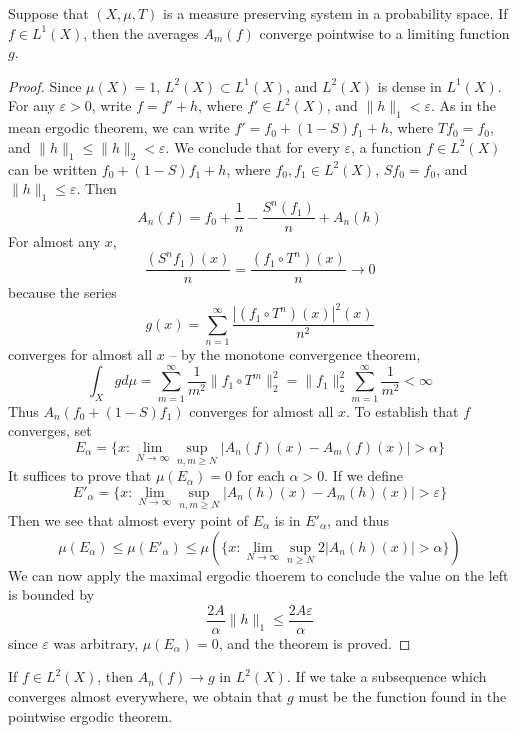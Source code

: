 \begin{theorem}
    Suppose that $(X,\mu,T)$ is a measure preserving system in a probability space. If $f \in L^1(X)$, then the averages $A_m(f)$ converge pointwise to a limiting function $g$.
\end{theorem}
\begin{proof}
    Since $\mu(X) = 1$, $L^2(X) \subset L^1(X)$, and $L^2(X)$ is dense in $L^1(X)$. For any $\varepsilon > 0$, write $f = f' + h$, where $f' \in L^2(X)$, and $\| h \|_1 < \varepsilon$. As in the mean ergodic theorem, we can write $f' = f_0 + (1 - S)f_1 + h$, where $Tf_0 = f_0$, and $\| h \|_1 \leq \| h \|_2 < \varepsilon$. We conclude that for every $\varepsilon$, a function $f \in L^2(X)$ can be written $f_0 + (1-S)f_1 + h$, where $f_0, f_1 \in L^2(X)$, $Sf_0 = f_0$, and $\| h \|_1 \leq \varepsilon$. Then
    \[ A_n(f) = f_0 + \frac{1}{n} - \frac{S^n(f_1)}{n} + A_n(h) \]
    For almost any $x$,
    \[ \frac{(S^nf_1)(x)}{n} = \frac{(f_1 \circ T^n)(x)}{n} \to 0 \]
    because the series
    \[ g(x) = \sum_{n = 1}^\infty \frac{|(f_1 \circ T^n)(x)|^2(x)}{n^2} \]
    converges for almost all $x$ -- by the monotone convergence theorem,
    \[ \int_X g d \mu = \sum_{m = 1}^\infty \frac{1}{m^2} \| f_1 \circ T^m \|^2_2 = \| f_1 \|_2^2 \sum_{m = 1}^\infty \frac{1}{m^2} < \infty \]
    Thus $A_n(f_0 + (1-S)f_1)$ converges for almost all $x$. To establish that $f$ converges, set
    \[ E_\alpha = \{ x : \lim_{N \to \infty} \sup_{n,m \geq N} |A_n(f)(x) - A_m(f)(x)| > \alpha \} \]
    It suffices to prove that $\mu(E_\alpha) = 0$ for each $\alpha > 0$. If we define
    \[ E'_\alpha = \{ x : \lim_{N \to \infty} \sup_{n,m \geq N} |A_n(h)(x) - A_m(h)(x)| > \varepsilon \} \]
    Then we see that almost every point of $E_\alpha$ is in $E'_\alpha$, and thus
    \[ \mu(E_\alpha) \leq \mu(E'_\alpha) \leq \mu(\{ x : \lim_{N \to \infty} \sup_{n \geq N} 2 |A_n(h)(x)| > \alpha \}) \]
    We can now apply the maximal ergodic thoerem to conclude the value on the left is bounded by
    \[ \frac{2A}{\alpha} \| h \|_1 \leq \frac{2A \varepsilon}{\alpha} \]
    since $\varepsilon$ was arbitrary, $\mu(E_\alpha) = 0$, and the theorem is proved.
\end{proof}

If $f \in L^2(X)$, then $A_n(f) \to g$ in $L^2(X)$. If we take a subsequence which converges almost everywhere, we obtain that $g$ must be the function found in the pointwise ergodic theorem.

